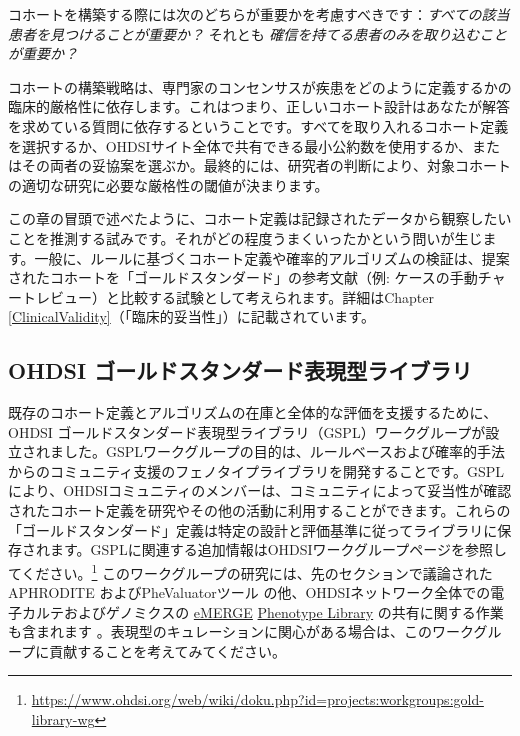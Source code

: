 \documentclass[
  11pt]{book}
\theoremstyle{definition}
\theoremstyle{definition}
\theoremstyle{definition}
\theoremstyle{definition}
\theoremstyle{remark}
\begin{document}
コホートを構築する際には次のどちらが重要かを考慮すべきです：\emph{すべての該当患者を見つけることが重要か？} それとも \emph{確信を持てる患者のみを取り込むことが重要か？}

コホートの構築戦略は、専門家のコンセンサスが疾患をどのように定義するかの臨床的厳格性に依存します。これはつまり、正しいコホート設計はあなたが解答を求めている質問に依存するということです。すべてを取り入れるコホート定義を選択するか、OHDSIサイト全体で共有できる最小公約数を使用するか、またはその両者の妥協案を選ぶか。最終的には、研究者の判断により、対象コホートの適切な研究に必要な厳格性の閾値が決まります。

この章の冒頭で述べたように、コホート定義は記録されたデータから観察したいことを推測する試みです。それがどの程度うまくいったかという問いが生じます。一般に、ルールに基づくコホート定義や確率的アルゴリズムの検証は、提案されたコホートを「ゴールドスタンダード」の参考文献（例: ケースの手動チャートレビュー）と比較する試験として考えられます。詳細はChapter \ref{ClinicalValidity}（「臨床的妥当性」）に記載されています。

\subsection{OHDSI ゴールドスタンダード表現型ライブラリ}\label{ohdsi-ux30b4ux30fcux30ebux30c9ux30b9ux30bfux30f3ux30c0ux30fcux30c9ux8868ux73feux578bux30e9ux30a4ux30d6ux30e9ux30ea}

既存のコホート定義とアルゴリズムの在庫と全体的な評価を支援するために、OHDSI ゴールドスタンダード表現型ライブラリ（GSPL）ワークグループが設立されました。GSPLワークグループの目的は、ルールベースおよび確率的手法からのコミュニティ支援のフェノタイプライブラリを開発することです。GSPLにより、OHDSIコミュニティのメンバーは、コミュニティによって妥当性が確認されたコホート定義を研究やその他の活動に利用することができます。これらの「ゴールドスタンダード」定義は特定の設計と評価基準に従ってライブラリに保存されます。GSPLに関連する追加情報はOHDSIワークグループページを参照してください。\footnote{\url{https://www.ohdsi.org/web/wiki/doku.php?id=projects:workgroups:gold-library-wg}} このワークグループの研究には、先のセクションで議論されたAPHRODITE \citep{Banda2017APHRODITE} およびPheValuatorツール \citep{Swerdel2019phevaluator} の他、OHDSIネットワーク全体での電子カルテおよびゲノミクスの \href{https://emerge.mc.vanderbilt.edu/}{eMERGE} \href{https://phekb.org/phenotypes}{Phenotype Library} の共有に関する作業も含まれます \citep{Hripcsak2019eMERGE}。表現型のキュレーションに関心がある場合は、このワークグループに貢献することを考えてみてください。 
\end{document}
